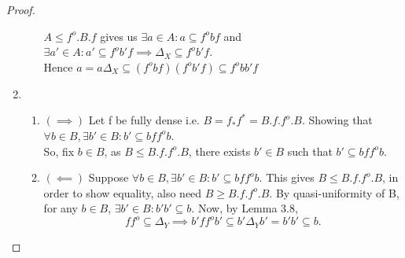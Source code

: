 \documentclass[a4paper]{article}
\theoremstyle{definition}
\begin{document}
\begin{proof}
\begin{enumerate}[label=(\alph*)]
\begin{enumerate}[label=(\roman*)]
							$A\leq f^o .B.f $
							gives us $\exists a \in A : a \subseteq f^o bf$ and
							$\exists a'\in A: a' \subseteq f^o b'f \implies \Delta_X \subseteq
							f^o b'	f$.\\
							Hence $a=a\Delta_X \subseteq (f^o bf) (f^o b'f)
							\subseteq f^o bb'f$
					\end{enumerate}
				\item	\begin{enumerate}[label=(\roman*)]
					\item $(\implies )$ Let f be fully dense i.e. $B=f_*f^* = B.f.f^o.B$.
						Showing that $\forall b \in B,\exists b'\in B: b'
						\subseteq bff^ob$.\\
						So, fix $b\in B$, as $B \leq B.f.f^o.B$, there exists $b' \in
						B$ such that $b' \subseteq bff^ob$.
					\item $(\impliedby)$ Suppose $\forall b \in B, \exists b' \in B:
						b' \subseteq bff^ob$. This gives $B\leq B.f.f^o .B$, in order
						to show equality, also need $B\geq B.f.f^o .B$.
						By quasi-uniformity of B, for any $b \in B$, $\exists b'\in B:b'b'
						\subseteq b$. Now, by Lemma 3.8,
						\[ f f^o \subseteq \Delta_Y \implies b'f f^o b' \subseteq b'
						\Delta_Y b'=b'b' \subseteq b.\]


\end{enumerate}
\end{enumerate}
\end{proof}
\end{document}
